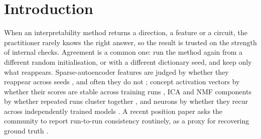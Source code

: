 \documentclass[10pt]{article}
\newcommand{\benchname}{OXIDE}
\newcommand{\draft}[1]{\textcolor{violet}{#1}}
\begin{document}
\begin{abstract}
\end{abstract}

\section{Introduction}

When an interpretability method returns a direction, a feature or a circuit, the
practitioner rarely knows the right answer, so the result is trusted on the strength of
internal checks. Agreement is a common one: run the method again from a different random
initialisation, or with a different dictionary seed, and keep only what reappears. Sparse-autoencoder features are judged by whether they reappear across seeds
\citep{song2025position}, and often they do not \citep{paulo2025sparse}; concept activation vectors by whether their scores
are stable across training runs \citep{kim2018tcav}, ICA and NMF components by whether
repeated runs cluster together \citep{himberg2004icasso,brunet2004metagenes}, and neurons
by whether they recur across independently trained models \citep{gurnee2024universal}. A
recent position paper asks the community to report run-to-run consistency routinely, as a
proxy for recovering ground truth \citep{song2025position}.
\end{document}
